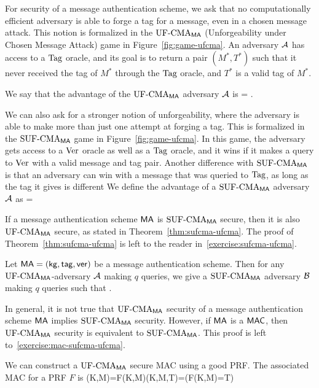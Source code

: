 For security of a message authentication scheme, we ask that no computationally efficient adversary is able to forge a tag for a message, even in a chosen message attack. This notion is formalized in the $\textnormal{UF-CMA}_{\mathsf{MA}}$ (Unforgeability under Chosen Message Attack) game in Figure~\ref{fig:game-ufcma}. An adversary ${\mathcal A}$ has access to a $\textnormal{Tag}$ oracle, and its goal is to return a pair $(M^*,T^*)$ such that it never received the tag of $M^*$ through the $\textnormal{Tag}$ oracle, and $T^*$ is a valid tag of $M^*$. 

We say that the advantage of the $\textnormal{UF-CMA}_{\mathsf{MA}}$ adversary ${\mathcal A}$ is 
\bnm
  \AdvUFCMA{\MA}{\advA} = .
\enm

We can also ask for a stronger notion of unforgeability, where the adversary is able to make more than just one attempt at forging a tag. This is formalized in the $\textnormal{SUF-CMA}_{\mathsf{MA}}$ game in Figure~\ref{fig:game-ufcma}. In this game, the adversary gets access to a $\textnormal{Ver}$ oracle as well as a $\textnormal{Tag}$ oracle, and it wins if it makes a query to $\textnormal{Ver}$ with a valid message and tag pair. Another difference with $\textnormal{SUF-CMA}_{\mathsf{MA}}$ is that an adversary can win with a message that was queried to $\textnormal{Tag}$, as long as the tag it gives is different  We define the advantage of a $\textnormal{SUF-CMA}_{\mathsf{MA}}$ adversary ${\mathcal A}$ as 
\bnm
  \AdvSUFCMA{\MA}{\advA} =  
\enm

If a message authentication scheme $\mathsf{MA}$ is $\textnormal{SUF-CMA}_{\mathsf{MA}}$ secure, then it is also $\textnormal{UF-CMA}_{\mathsf{MA}}$ secure, as stated in Theorem~\ref{thm:sufcma-ufcma}. The proof of Theorem~\ref{thm:sufcma-ufcma} is left to the reader in~\ref{exercise:sufcma-ufcma}.
\begin{theorem}
	\label{thm:sufcma-ufcma}
Let $\mathsf{MA} = ({\sf kg},\mathsf{tag},\mathsf{ver})$ be a message authentication scheme. Then for any $\textnormal{UF-CMA}_{\mathsf{MA}}$-adversary ${\mathcal A}$ making $q$ queries, we give a $\textnormal{SUF-CMA}_{\mathsf{MA}}$ adversary ${\mathcal B}$ making $q$ queries such that
\bnm
	\AdvUFCMA{\MA}{\advA} \le \AdvSUFCMA{\MA}{\advB} \;.
\enm
\end{theorem}

In general, it is not true that $\textnormal{UF-CMA}_{\mathsf{MA}}$ security of a message authentication scheme $\mathsf{MA}$ implies $\textnormal{SUF-CMA}_{\mathsf{MA}}$ security. However, if $\mathsf{MA}$ is a $\mathsf{MAC}$, then $\textnormal{UF-CMA}_{\mathsf{MA}}$ security is equivalent to $\textnormal{SUF-CMA}_{\mathsf{MA}}$. This proof is left to~\ref{exercise:mac-sufcma-ufcma}.

We can construct a $\textnormal{UF-CMA}_{\mathsf{MA}}$ secure MAC using a good PRF. The associated MAC for a PRF $F$ is
\bnm
\mtag(K,M)=F(K,M)\myInd\myInd \ver(K,M,T)=(F(K,M)=T)
\enm

